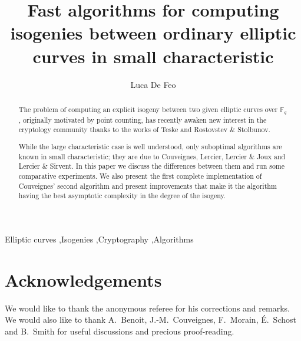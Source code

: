 \documentclass[preprint,1p]{elsarticle}
\newcommand{\F}{\mathbb{F}}  %
\newcommand{\0}{\mathcal{O}}  %
\begin{document}
\begin{frontmatter}

\title{Fast algorithms for computing isogenies between ordinary
  elliptic curves in small characteristic}
\author{Luca De Feo}
\address{LIX, {\'E}cole Polytechnique, 91128 Palaiseau, France}


\begin{abstract}
  The problem of computing an explicit isogeny between two given
  elliptic curves over $\F_q$, originally motivated by point counting,
  has recently awaken new interest in the cryptology community thanks
  to the works of Teske and Rostovstev \& Stolbunov.

  While the large characteristic case is well understood, only
  suboptimal algorithms are known in small characteristic; they are
  due to Couveignes, Lercier, Lercier \& Joux and Lercier \& Sirvent.
  In this paper we discuss the differences between them and run some
  comparative experiments. We also present the first complete
  implementation of Couveignes' second algorithm and present
  improvements that make it the algorithm having the best asymptotic
  complexity in the degree of the isogeny.
\end{abstract}

\begin{keyword}
  Elliptic curves \sep Isogenies \sep Cryptography \sep Algorithms
\end{keyword}

\end{frontmatter}







%



\section*{Acknowledgements}
We would like to thank the anonymous referee for his corrections and
remarks. We would also like to thank A.~Benoit, J.-M.~Couveignes,
F.~Morain, É.~Schost and B.~Smith for useful discussions and precious
proof-reading.


\end{document}
